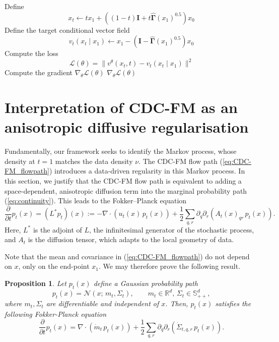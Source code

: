 \documentclass{article} %
\newcommand{\R}{\mathbb{R}}
\newtheorem{proposition}{Proposition}
\newcommand{\N}{\mathcal{N}}
\newcommand{\G}{\widehat{\mathbf{\Gamma}}}
\begin{document}
\begin{table}[h]
\begin{minipage}[t]{0.48\textwidth}
\begin{algorithm}[H]
\begin{algorithmic}[1]
        \State Define
        \[x_t \gets tx_1 + \left(\left(1-t\right)\mathbf{I} + t\G(x_1)^{0.5}\right)x_0 \]
        \State Define the target conditional vector field
        \[ v_t(x_t \mid x_1) \gets x_1 - \left( \mathbf{I} - \G(x_1)^{0.5}\right) x_0
        \]
        \State Compute the loss
        \[
        \mathcal{L}(\theta)=\bigl\|v^\theta(x_t,t)-v_t(x_t\mid x_1)\bigr\|^2
        \]
        \State Compute the gradient \(\nabla_\theta \mathcal{L}(\theta)\)
        \State \Return \(\nabla_\theta \mathcal{L}(\theta)\)
      \end{algorithmic}
    \end{algorithm}
  \end{minipage}
\end{table}

\section{Interpretation of CDC-FM as an anisotropic diffusive regularisation}\label{section:aniso_diff}

Fundamentally, our framework seeks to identify the Markov process, whose density at $t=1$ matches the data density $\nu$.
The CDC-FM flow path (\ref{eq:CDC-FM_flowpath}) introduces a data-driven regularity in this Markov process.
In this section, we justify that the CDC-FM flow path is equivalent to adding a space-dependent, anisotropic diffusion term into the marginal probability path (\ref{eq:continuity}).
This leads to the Fokker–Planck equation
%
\begin{equation}\label{eq:diffusion}
    \frac{\partial}{\partial t} p_t(x) = (L^*p_t)(x) := - \nabla \cdot (u_t(x)\,p_t(x)) + \frac{1}{2}\sum_{q,r}\partial_q\partial_r(A_t(x)_{qr}\, p_t(x)).
\end{equation}
%
Here, $L^*$ is the adjoint of $L$, the infinitesimal generator of the stochastic process, and $A_t$ is the diffusion tensor, which adapts to the local geometry of data.

Note that the mean and covariance in (\ref{eq:CDC-FM_flowpath}) do not depend on $x$, only on the end-point $x_1$. 
We may therefore prove the following result.

\begin{proposition}\label{FPequationflowpath}
    Let $p_t(x)$ define a Gaussian probability path
    \begin{equation}
        p_t(x)=\N(x;\,m_t,\Sigma_t),\qquad m_t\in\R^d,\,\Sigma_t\in \mathbb{S}_{++}^d,
    \end{equation}
    where $m_t,\Sigma_t$ are differentiable and independent of $x$.
    Then, $p_t(x)$ satisfies the following Fokker-Planck equation
    \begin{equation}
        \frac{\partial}{\partial t}p_t(x) = \nabla\cdot(\dot{m}_t\,p_t(x)) + \frac{1}{2}\sum_{q,r}\partial_q\partial_r(\dot{\Sigma}_{t,q,r}\,p_t(x)).
    \end{equation}
\end{proposition}
\end{document}
